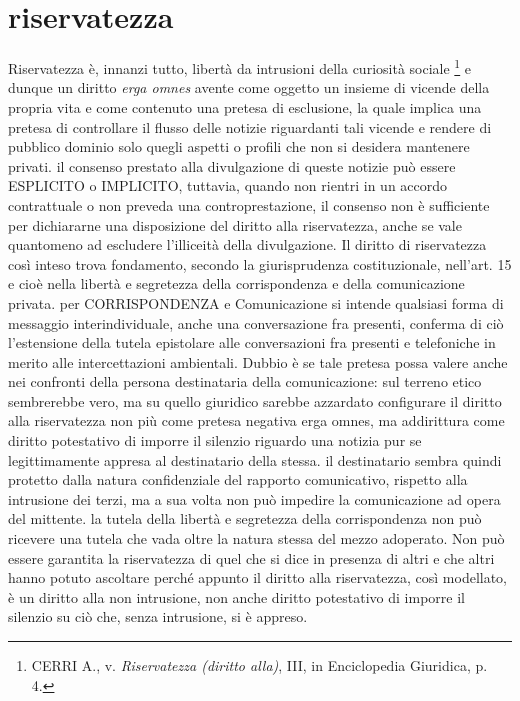 \section{riservatezza}%
Riservatezza è, innanzi tutto, libertà da intrusioni della curiosità sociale \footnote{CERRI A., v. \textit{Riservatezza (diritto alla)}, III, in Enciclopedia Giuridica, p. 4.} e dunque un diritto \textit{erga omnes} avente come oggetto un insieme di vicende della propria vita e come contenuto una pretesa di esclusione, la quale implica una pretesa di controllare il flusso delle notizie riguardanti tali vicende e rendere di pubblico dominio solo quegli aspetti  o profili che non si desidera mantenere privati.
il consenso prestato alla divulgazione di queste notizie può essere ESPLICITO o IMPLICITO, tuttavia, quando non rientri in un accordo contrattuale o non preveda una controprestazione, il consenso non è sufficiente per dichiararne una disposizione del diritto alla riservatezza, anche se vale quantomeno ad escludere l'illiceità della divulgazione.
Il diritto di riservatezza così inteso trova fondamento, secondo la giurisprudenza costituzionale, nell'art. 15 e cioè  nella libertà e segretezza della corrispondenza e della comunicazione privata.
per CORRISPONDENZA e Comunicazione si intende qualsiasi forma di messaggio interindividuale, anche una conversazione fra presenti, conferma di ciò l'estensione della tutela epistolare alle conversazioni fra presenti e telefoniche in merito alle intercettazioni ambientali. Dubbio è se tale pretesa possa valere anche nei confronti della persona destinataria della comunicazione: sul terreno etico sembrerebbe vero, ma su quello giuridico sarebbe azzardato configurare il diritto alla riservatezza non più come pretesa negativa erga omnes, ma addirittura come diritto potestativo di imporre il silenzio riguardo una notizia pur se legittimamente appresa al destinatario della stessa. il destinatario sembra quindi protetto dalla natura confidenziale del rapporto comunicativo, rispetto alla intrusione dei terzi, ma a sua volta non può impedire la comunicazione ad opera del mittente. la tutela della libertà e segretezza della corrispondenza non può ricevere una tutela che vada oltre la natura stessa del mezzo adoperato.
Non può essere garantita la riservatezza di quel che si dice in presenza di altri e che altri hanno potuto ascoltare perché appunto il diritto alla riservatezza, così modellato, è un diritto alla non intrusione, non anche diritto potestativo di imporre il silenzio su ciò che, senza intrusione, si è appreso.

